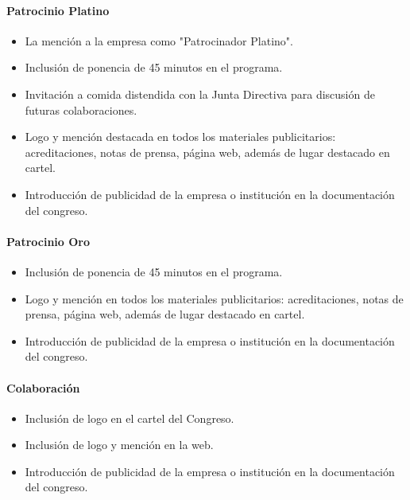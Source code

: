 \documentclass[11pt]{ritsi/article}
\begin{document}
\paragraph{Patrocinio Platino} 

\begin{itemize}
    \item La mención a la empresa como "Patrocinador Platino".
    \item Inclusión de ponencia de 45 minutos en el programa.
    \item Invitación a comida distendida con la Junta Directiva para discusión de futuras colaboraciones.
    \item Logo y mención destacada en todos los materiales publicitarios: acreditaciones, notas de prensa, página web, además de lugar destacado en cartel.
    \item Introducción de publicidad de la empresa o institución en la documentación del congreso.
\end{itemize}

\paragraph{Patrocinio Oro} 

\begin{itemize}
    \item Inclusión de ponencia de 45 minutos en el programa.
    \item Logo y mención en todos los materiales publicitarios: acreditaciones, notas de prensa, página web, además de lugar destacado en cartel.
    \item Introducción de publicidad de la empresa o institución en la documentación del congreso.
\end{itemize}

\paragraph{Colaboración} 

\begin{itemize}
    \item Inclusión de logo en el cartel del Congreso.
    \item Inclusión de logo y mención en la web.
    \item Introducción de publicidad de la empresa o institución en la documentación del congreso.
\end{itemize}
\end{document}
